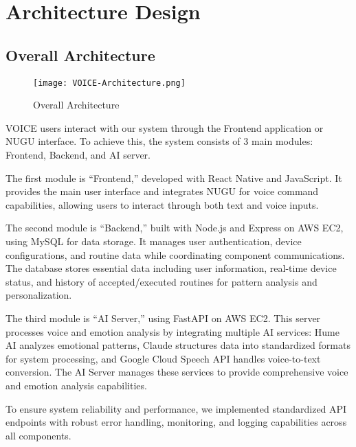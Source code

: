 \documentclass[conference]{IEEEtran}
\begin{document}
\vspace{1em} %

\section{Architecture Design}

\subsection{Overall Architecture}
\vspace{0.5em}

\begin{figure} [h!]
	\centering
	\texttt{[image: VOICE-Architecture.png]}
	\caption{Overall Architecture}
	\label{fig:Overall Architecture}
\end{figure}

VOICE users interact with our system through the Frontend application or NUGU interface. To achieve this, the system consists of 3 main modules: Frontend, Backend, and AI server.

The first module is “Frontend,” developed with React Native and JavaScript. It provides the main user interface and integrates NUGU for voice command capabilities, allowing users to interact through both text and voice inputs.

The second module is “Backend,” built with Node.js and Express on AWS EC2, using MySQL for data storage. It manages user authentication, device configurations, and routine data while coordinating component communications. The database stores essential data including user information, real-time device status, and history of accepted/executed routines for pattern analysis and personalization.

The third module is “AI Server,” using FastAPI on AWS EC2. This server processes voice and emotion analysis by integrating multiple AI services: Hume AI analyzes emotional patterns, Claude structures data into standardized formats for system processing, and Google Cloud Speech API handles voice-to-text conversion. The AI Server manages these services to provide comprehensive voice and emotion analysis capabilities.

To ensure system reliability and performance, we implemented standardized API endpoints with robust error handling, monitoring, and logging capabilities across all components.
\vspace{0.7em} %
\end{document}
